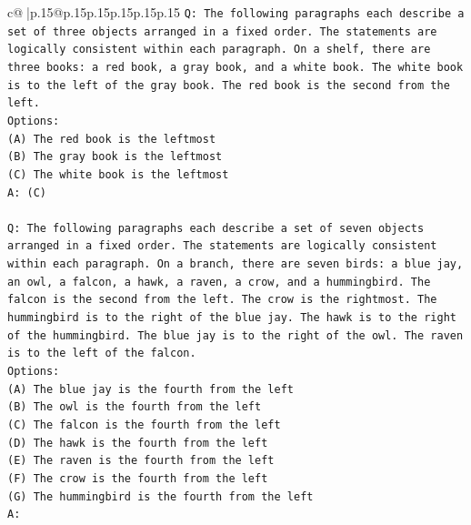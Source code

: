 \documentclass{article}
\begin{document}
{\begin{supertabular}{c@{$\;$}|p{.15\linewidth}@{}p{.15\linewidth}p{.15\linewidth}p{.15\linewidth}p{.15\linewidth}p{.15\linewidth}}
{{{\texttt{Q: The following paragraphs each describe a set of three objects arranged in a fixed order. The statements are logically consistent within each paragraph. On a shelf, there are three books: a red book, a gray book, and a white book. The white book is to the left of the gray book. The red book is the second from the left.} \\
\texttt{Options:} \\
\texttt{(A) The red book is the leftmost} \\
\texttt{(B) The gray book is the leftmost} \\
\texttt{(C) The white book is the leftmost} \\
\texttt{A: (C)} \\
\\ 
\texttt{Q: The following paragraphs each describe a set of seven objects arranged in a fixed order. The statements are logically consistent within each paragraph. On a branch, there are seven birds: a blue jay, an owl, a falcon, a hawk, a raven, a crow, and a hummingbird. The falcon is the second from the left. The crow is the rightmost. The hummingbird is to the right of the blue jay. The hawk is to the right of the hummingbird. The blue jay is to the right of the owl. The raven is to the left of the falcon.} \\
\texttt{Options:} \\
\texttt{(A) The blue jay is the fourth from the left} \\
\texttt{(B) The owl is the fourth from the left} \\
\texttt{(C) The falcon is the fourth from the left} \\
\texttt{(D) The hawk is the fourth from the left} \\
\texttt{(E) The raven is the fourth from the left} \\
\texttt{(F) The crow is the fourth from the left} \\
\texttt{(G) The hummingbird is the fourth from the left} \\
\texttt{A:} \\
            }
        }
    }
     \\ \\


\end{supertabular}}
\end{document}
